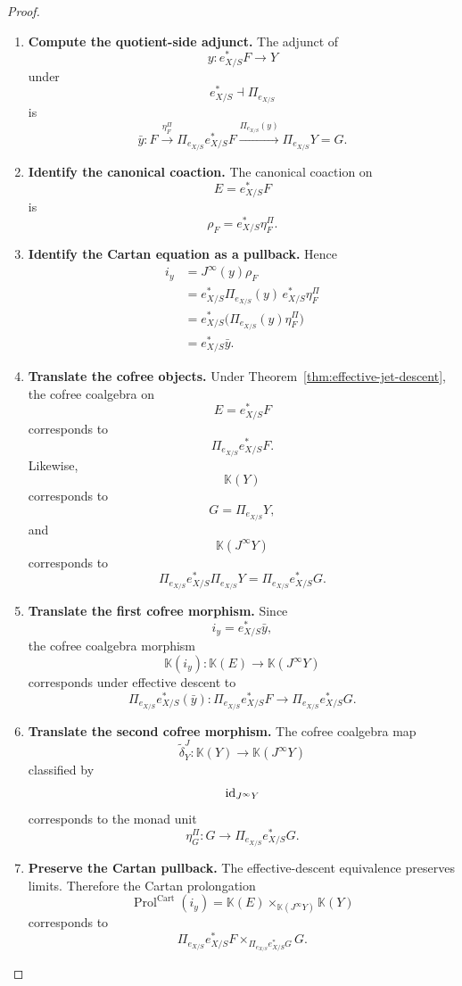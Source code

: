 \begin{proof}
\leavevmode
\begin{enumerate}[label=\textup{(\arabic*)}]
    \item \textbf{Compute the quotient-side adjunct.}
The adjunct of
\[
  y:e_{X/S}^*F\to Y
\]
under
\[
  e_{X/S}^*\dashv\Pi_{e_{X/S}}
\]
is
\[
  \bar y:
  F
  \xrightarrow{\eta^\Pi_F}
  \Pi_{e_{X/S}}e_{X/S}^*F
  \xrightarrow{\Pi_{e_{X/S}}(y)}
  \Pi_{e_{X/S}}Y
  =
  G.
\]

    \item \textbf{Identify the canonical coaction.}
The canonical coaction on
\[
  E=e_{X/S}^*F
\]
is
\[
  \rho_F=e_{X/S}^*\eta^\Pi_F.
\]

    \item \textbf{Identify the Cartan equation as a pullback.}
Hence
\[
\begin{aligned}
  i_y
  &=J^\infty(y)\rho_F\\
  &=e_{X/S}^*\Pi_{e_{X/S}}(y)\,e_{X/S}^*\eta^\Pi_F\\
  &=e_{X/S}^*\bigl(\Pi_{e_{X/S}}(y)\eta^\Pi_F\bigr)\\
  &=e_{X/S}^*\bar y.
\end{aligned}
\]

    \item \textbf{Translate the cofree objects.}
Under
Theorem~\ref{thm:effective-jet-descent}, the cofree coalgebra on
\[
  E=e_{X/S}^*F
\]
corresponds to
\[
  \Pi_{e_{X/S}}e_{X/S}^*F.
\]
Likewise,
\[
  \mathbb K(Y)
\]
corresponds to
\[
  G=\Pi_{e_{X/S}}Y,
\]
and
\[
  \mathbb K(J^\infty Y)
\]
corresponds to
\[
  \Pi_{e_{X/S}}e_{X/S}^*\Pi_{e_{X/S}}Y
  =
  \Pi_{e_{X/S}}e_{X/S}^*G.
\]

    \item \textbf{Translate the first cofree morphism.}
Since
\[
  i_y=e_{X/S}^*\bar y,
\]
the cofree coalgebra morphism
\[
  \mathbb K(i_y):
  \mathbb K(E)\to\mathbb K(J^\infty Y)
\]
corresponds under effective descent to
\[
  \Pi_{e_{X/S}}e_{X/S}^*(\bar y):
  \Pi_{e_{X/S}}e_{X/S}^*F
  \longrightarrow
  \Pi_{e_{X/S}}e_{X/S}^*G.
\]

    \item \textbf{Translate the second cofree morphism.}
The cofree coalgebra map
\[
  \widetilde\delta^J_Y:
  \mathbb K(Y)\to\mathbb K(J^\infty Y)
\]
classified by
\[
  \operatorname{id}_{J^\infty Y}
\]
corresponds to the monad unit
\[
  \eta^\Pi_G:
  G\longrightarrow\Pi_{e_{X/S}}e_{X/S}^*G.
\]

    \item \textbf{Preserve the Cartan pullback.}
The effective-descent equivalence preserves limits. Therefore the Cartan
prolongation
\[
  \operatorname{Prol}^{\mathrm{Cart}}(i_y)
  =
  \mathbb K(E)
  \times_{\mathbb K(J^\infty Y)}
  \mathbb K(Y)
\]
corresponds to
\[
  \Pi_{e_{X/S}}e_{X/S}^*F
  \times_{\Pi_{e_{X/S}}e_{X/S}^*G}
  G.
\]


\end{enumerate}
\end{proof}
